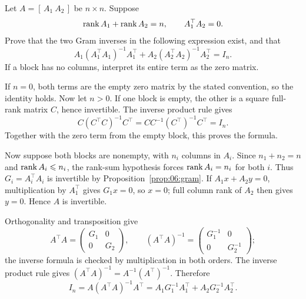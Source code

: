 \begin{problem}\label{ex:06:complementary-blocks}
Let \(A=[\,A_1\ A_2\,]\) be \(n\times n\).
Suppose
\[
\operatorname{rank} A_1+\operatorname{rank} A_2=n,\qquad A_1^\top A_2=0.
\]
Prove that the two Gram inverses in the following expression exist,
and that
\[
A_1(A_1^\top A_1)^{-1}A_1^\top+
A_2(A_2^\top A_2)^{-1}A_2^\top=I_n.
\]
If a block has no columns, interpret its entire term as the zero matrix.
\end{problem}
\begin{solution}
If \(n=0\), both terms are the empty zero matrix by the stated convention,
so the identity holds. Now let \(n>0\).
If one block is empty, the other is a square full-rank matrix \(C\),
hence invertible. The inverse product rule gives
\[
C(C^\top C)^{-1}C^\top
=CC^{-1}(C^\top)^{-1}C^\top=I_n.
\]
Together with the zero term from the empty block, this proves the formula.

Now suppose both blocks are nonempty, with \(n_i\) columns in \(A_i\).
Since \(n_1+n_2=n\) and
\(\operatorname{rank} A_i\leqslant n_i\), the rank-sum hypothesis forces
\(\operatorname{rank} A_i=n_i\) for both \(i\).
Thus \(G_i=A_i^\top A_i\) is invertible by
Proposition~\ref{prop:06:gram}.
If \(A_1x+A_2y=0\), multiplication by \(A_1^\top\) gives \(G_1x=0\),
so \(x=0\); full column rank of \(A_2\) then gives \(y=0\).
Hence \(A\) is invertible.

Orthogonality and transposition give
\[
A^\top A=\begin{pmatrix}G_1&0\\0&G_2\end{pmatrix},\qquad
(A^\top A)^{-1}=\begin{pmatrix}G_1^{-1}&0\\0&G_2^{-1}\end{pmatrix};
\]
the inverse formula is checked by multiplication in both orders.
The inverse product rule gives \((A^\top A)^{-1}=A^{-1}(A^\top)^{-1}\).
Therefore
\[
I_n=A(A^\top A)^{-1}A^\top
=A_1G_1^{-1}A_1^\top+A_2G_2^{-1}A_2^\top.
\]
\end{solution}


